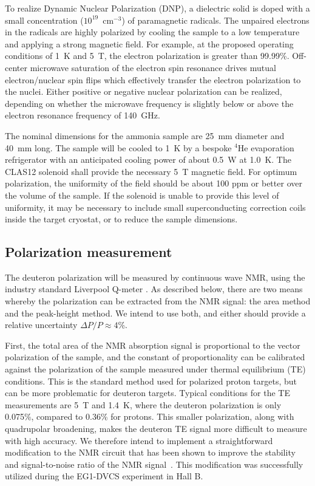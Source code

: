 \documentclass[preprint,12pt]{elsarticle}
\begin{document}
To realize Dynamic Nuclear Polarization (DNP), a dielectric solid is doped with a small concentration 
($10^{19}$~cm$^{\minus3}$) of paramagnetic radicals.  The unpaired electrons in the radicals are highly polarized by cooling the sample to a low temperature and applying a strong magnetic field.  For example, at the proposed operating conditions of 1~K and 5~T, the electron polarization is greater than 99.99\%.  Off-center microwave saturation of the electron spin resonance drives mutual electron/nuclear spin flips which effectively transfer the electron polarization to the nuclei.  Either positive or negative nuclear polarization can be realized, depending on whether the microwave frequency is slightly below or above the electron resonance frequency of 140~GHz.

The nominal dimensions for the ammonia sample are 25~mm diameter and 40~mm long.  The sample will be cooled to 1~K by a bespoke $^4$He evaporation refrigerator with an anticipated cooling power of about 0.5~W at 1.0~K.  The CLAS12 solenoid shall provide the necessary 5~T magnetic field.  For optimum polarization, the uniformity of the field should be about 100 ppm or better over the volume of the sample.  If the solenoid is unable to provide this level of uniformity, it may be necessary to include small superconducting correction
coils inside the target cryostat, or to reduce the sample dimensions.  

\subsection{Polarization measurement}
The deuteron polarization will be measured by continuous wave NMR, using the industry standard
Liverpool Q-meter \cite{Court1993}.  As described below, there are two means whereby the polarization can be extracted from the NMR signal: the area method and the peak-height method.  We intend to use both, and either should provide a relative uncertainty $\Delta P/P \approx 4$\%.

First, the total area of the NMR absorption signal is proportional to the vector polarization of the sample, and the constant of proportionality can be calibrated against the polarization of the sample measured under thermal equilibrium (TE) conditions.  This is the standard method used for polarized proton targets, but can be more problematic for deuteron targets.  Typical conditions for the TE measurements are 5~T and 1.4~K,
where the deuteron polarization is only 0.075\%, compared to 0.36\% for protons.
This smaller polarization, along with quadrupolar broadening, makes the deuteron TE signal more difficult to measure with high accuracy.
We therefore intend to implement a straightforward modification to the NMR circuit that has been shown to improve the stability and signal-to-noise ratio of the NMR signal~\cite{Court2004}. This modification was 
successfully utilized during the EG1-DVCS experiment in Hall B.  
\end{document}
